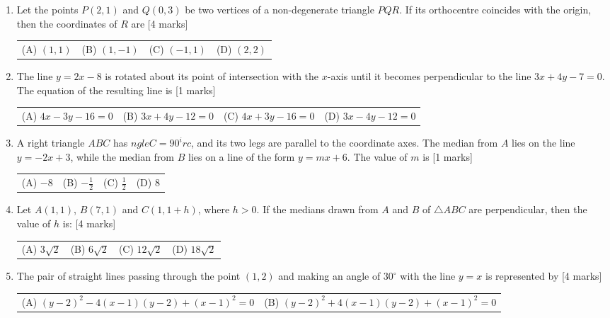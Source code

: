 \documentclass[11pt,a4paper]{article}
\begin{document}
\begin{enumerate}[resume]
\item Let the points $P(2,1)$ and $Q(0,3)$ be two vertices of a non-degenerate triangle $PQR$. If its orthocentre coincides with the origin, then the coordinates of $R$ are \hfill [4 marks]
{\renewcommand{\arraystretch}{1.8}
\begin{tabularx}{\linewidth}{X X X X}
(A) \quad $(1,1)$ & (B) \quad $(1,-1)$ & (C) \quad $(-1,1)$ & (D) \quad $(2,2)$ \\[10pt]
\end{tabularx}}
\item The line $y=2x-8$ is rotated about its point of intersection with the $x$-axis until it becomes perpendicular to the line $3x+4y-7=0$. The equation of the resulting line is \hfill [1 marks]
{\renewcommand{\arraystretch}{1.8}
\begin{tabularx}{\linewidth}{X X X X}
(A) \quad $4x-3y-16=0$ & (B) \quad $3x+4y-12=0$ & (C) \quad $4x+3y-16=0$ & (D) \quad $3x-4y-12=0$ \\[10pt]
\end{tabularx}}
\item A right triangle $ABC$ has $ngle C=90^irc$, and its two legs are parallel to the coordinate axes. The median from $A$ lies on the line $y=-2x+3$, while the median from $B$ lies on a line of the form $y=mx+6$. The value of $m$ is \hfill [1 marks]
{\renewcommand{\arraystretch}{1.8}
\begin{tabularx}{\linewidth}{X X X X}
(A) \quad $-8$ & (B) \quad $-\frac{1}{2}$ & (C) \quad $\frac{1}{2}$ & (D) \quad $8$ \\[10pt]
\end{tabularx}}
\item Let $A(1,1)$, $B(7,1)$ and $C(1,1+h)$, where $h>0$. If the medians drawn from $A$ and $B$ of $\triangle ABC$ are perpendicular, then the value of $h$ is: \hfill [4 marks]
{\renewcommand{\arraystretch}{1.8}
\begin{tabularx}{\linewidth}{X X X X}
(A) \quad $3\sqrt{2}$ & (B) \quad $6\sqrt{2}$ & (C) \quad $12\sqrt{2}$ & (D) \quad $18\sqrt{2}$ \\[10pt]
\end{tabularx}}
\item The pair of straight lines passing through the point $(1,2)$ and making an angle of $30^\circ$ with the line $y=x$ is represented by \hfill [4 marks]
{\renewcommand{\arraystretch}{1.8}
\begin{tabularx}{\linewidth}{X X}
(A) \quad $(y-2)^2-4(x-1)(y-2)+(x-1)^2=0$ & (B) \quad $(y-2)^2+4(x-1)(y-2)+(x-1)^2=0$ \\[10pt]

\end{tabularx}}
\end{enumerate}
\end{document}
